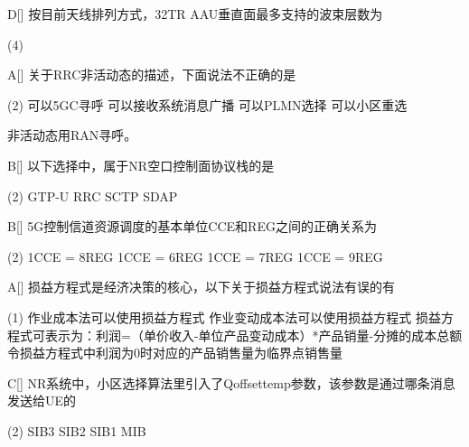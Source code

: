 \begin{choice}{D}[]
    按目前天线排列方式，32TR AAU垂直面最多支持的波束层数为
    \begin{tasks}(4)
    \end{tasks}
\end{choice}


\begin{choice}{A}[]
    关于RRC非活动态的描述，下面说法不正确的是
    \begin{tasks}(2)
        \task 可以5GC寻呼
        \task 可以接收系统消息广播
        \task 可以PLMN选择
        \task 可以小区重选
    \end{tasks}
\end{choice}
\begin{solution}
    非活动态用RAN寻呼。
\end{solution}

\begin{choice}{B}[]
    以下选择中，属于NR空口控制面协议栈的是
    \begin{tasks}(2)
        \task GTP-U
        \task RRC
        \task SCTP
        \task SDAP
    \end{tasks}
\end{choice}


\begin{choice}{B}[]
    5G控制信道资源调度的基本单位CCE和REG之间的正确关系为
    \begin{tasks}(2)
        \task 1CCE = 8REG
        \task 1CCE = 6REG
        \task 1CCE = 7REG
        \task 1CCE = 9REG
    \end{tasks}
\end{choice}

\begin{choice}{A}[]
    损益方程式是经济决策的核心，以下关于损益方程式说法有误的有
    \begin{tasks}(1)
        \task 作业成本法可以使用损益方程式
        \task 作业变动成本法可以使用损益方程式
        \task 损益方程式可表示为：利润=（单价收入-单位产品变动成本）*产品销量-分摊的成本总额
        \task 令损益方程式中利润为0时对应的产品销售量为临界点销售量
    \end{tasks}
\end{choice}

\begin{choice}{C}[]
    NR系统中，小区选择算法里引入了Qoffsettemp参数，该参数是通过哪条消息发送给UE的
    \begin{tasks}(2)
        \task SIB3
        \task SIB2
        \task SIB1
        \task MIB
    \end{tasks}
\end{choice}



